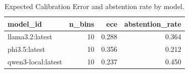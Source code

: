 \begin{table}
\caption{Expected Calibration Error and abstention rate by model.}
\label{tab:calibration_and_abstention}
\begin{tabular}{lrrr}
\toprule
model_id & n_bins & ece & abstention_rate \\
\midrule
llama3.2:latest & 10 & 0.288 & 0.364 \\
phi3.5:latest & 10 & 0.356 & 0.212 \\
qwen3-local:latest & 10 & 0.237 & 0.450 \\
\bottomrule
\end{tabular}
\end{table}
